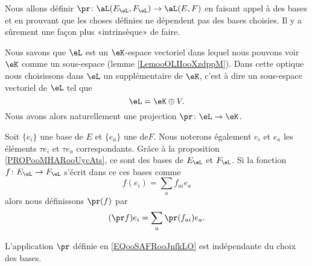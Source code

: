 \begin{probleme}
    Nous allons définir \( \pr\colon \aL(E_{\eL},F_{\eL})\to \aL(E,F)\) en faisant appel à des bases et en prouvant que les choses définies ne dépendent pas des bases choisies. Il y a sûrement une façon plus «intrinsèque» de faire.
\end{probleme}


Nous savons que \( \eL\) est un \( \eK\)-espace vectoriel dans lequel nous pouvons voir \( \eK\) comme un sous-espace (lemme \ref{LemooOLIIooXzdppM}). Dans cette optique nous choisissons dans \( \eL\) un supplémentaire de \( \eK\), c'est à dire un sous-espace vectoriel de \( \eL\) tel que
\begin{equation}
    \eL=\eK\oplus V.
\end{equation}
Nous avons alors naturellement une projection \( \pr\colon \eL\to \eK\).

Soit \( \{ e_i \}\) une base de \( E \) et \(\{ e_a \}\) une  de\( F\). Nous noterons également \( e_i\) et \( e_a\) les éléments \( \tau e_i\) et \( \tau e_a\) correspondants. Grâce à la proposition \ref{PROPooMHARooUycAts}, ce sont des bases de \( E_{\eL}\) et \( F_{\eL}\). Si la fonction \( f\colon E_{\eL}\to F_{\eL}\) s'écrit dans ce ces bases comme
\begin{equation}
    f(e_i)=\sum_af_{ai}e_a
\end{equation}
alors nous définissons \( \pr(f)\) par 
\begin{equation}        \label{EQooSAFRooJnfkLO}
    (\pr f)e_i=\sum_a\pr(f_{ai})e_a.
\end{equation}

\begin{proposition}      \label{PROPooOEHTooHyjuZQ}
    L'application \( \pr\) définie en \eqref{EQooSAFRooJnfkLO} est indépendante du choix des bases.
\end{proposition}

